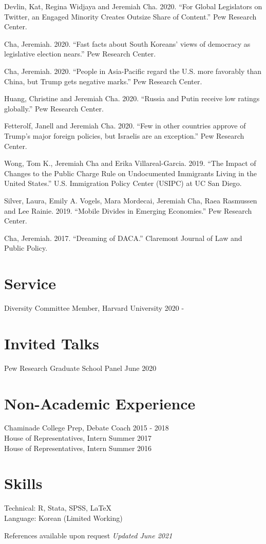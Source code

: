 \documentclass[margin, line]{res}
\begin{document}
\begin{resume}
\begin{etaremune}
	\item Devlin, Kat, Regina Widjaya and Jeremiah Cha. 2020. ``For Global Legislators on Twitter, an Engaged Minority Creates Outsize Share of Content.'' Pew Research Center.
	\item Cha, Jeremiah. 2020. ``Fast facts about South Koreans’ views of democracy as legislative election nears.'' Pew Research Center.
	\item Cha, Jeremiah. 2020. ``People in Asia-Pacific regard the U.S. more favorably than China, but Trump gets negative marks.'' Pew Research Center.
	\item Huang, Christine and Jeremiah Cha. 2020. ``Russia and Putin receive low ratings globally.'' Pew Research Center.
	\item Fetterolf, Janell and Jeremiah Cha. 2020. ``Few in other countries approve of Trump’s major foreign policies, but Israelis are an exception.'' Pew Research Center.
	\item Wong, Tom K., Jeremiah Cha and Erika Villareal-Garcia. 2019. ``The Impact of Changes to the Public Charge Rule on Undocumented Immigrants Living in the United States.'' U.S. Immigration Policy Center (USIPC) at UC San Diego.
	\item Silver, Laura, Emily A. Vogels, Mara Mordecai, Jeremiah Cha, Raea Rasmussen and Lee Rainie. 2019. ``Mobile Divides in Emerging Economies.'' Pew Research Center.
	\item Cha, Jeremiah. 2017. ``Dreaming of DACA.'' Claremont Journal of Law and Public Policy.
\end{etaremune}


\section{Service}
Diversity Committee Member, Harvard University \hfill 2020 -

\section{Invited Talks}
Pew Research Graduate School Panel \hfill June 2020

\section{Non-Academic Experience}
Chaminade College Prep, Debate Coach \hfill 2015 - 2018\\
House of Representatives, Intern \hfill Summer 2017\\
House of Representatives, Intern \hfill Summer 2016

\section{Skills}
Technical: R, Stata, SPSS, \LaTeX\\
Language: Korean (Limited Working)

\small{References available upon request} \hfill \small{\textit{Updated June 2021}}

\end{resume}
\end{document}
